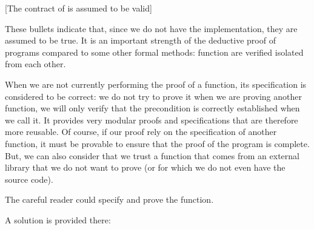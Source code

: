 [The contract of  is assumed to be valid]


These bullets indicate that, since we do not have the implementation,
they are assumed to be true. It is an important strength of the
deductive proof of programs compared to some other formal methods:
function are verified isolated from each other.

When we are not currently performing the proof of a function, its
specification is considered to be correct: we do not try to prove it
when we are proving another function, we will only verify that the
precondition is correctly established when we call it. It provides very
modular proofs and specifications that are therefore more reusable. Of
course, if our proof rely on the specification of another function, it
must be provable to ensure that the proof of the program is complete.
But, we can also consider that we trust a function that comes from an
external library that we do not want to prove (or for which we do not
even have the source code).

The careful reader could specify and prove the 
function.

A solution is provided there:



